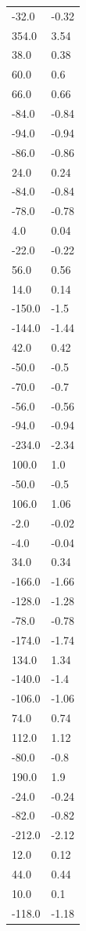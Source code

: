 \begin{longtable}{ll}
-32.0 & -0.32 \\
354.0 & 3.54 \\
38.0 & 0.38 \\
60.0 & 0.6 \\
66.0 & 0.66 \\
-84.0 & -0.84 \\
-94.0 & -0.94 \\
-86.0 & -0.86 \\
24.0 & 0.24 \\
-84.0 & -0.84 \\
-78.0 & -0.78 \\
4.0 & 0.04 \\
-22.0 & -0.22 \\
56.0 & 0.56 \\
14.0 & 0.14 \\
-150.0 & -1.5 \\
-144.0 & -1.44 \\
42.0 & 0.42 \\
-50.0 & -0.5 \\
-70.0 & -0.7 \\
-56.0 & -0.56 \\
-94.0 & -0.94 \\
-234.0 & -2.34 \\
100.0 & 1.0 \\
-50.0 & -0.5 \\
106.0 & 1.06 \\
-2.0 & -0.02 \\
-4.0 & -0.04 \\
34.0 & 0.34 \\
-166.0 & -1.66 \\
-128.0 & -1.28 \\
-78.0 & -0.78 \\
-174.0 & -1.74 \\
134.0 & 1.34 \\
-140.0 & -1.4 \\
-106.0 & -1.06 \\
74.0 & 0.74 \\
112.0 & 1.12 \\
-80.0 & -0.8 \\
190.0 & 1.9 \\
-24.0 & -0.24 \\
-82.0 & -0.82 \\
-212.0 & -2.12 \\
12.0 & 0.12 \\
44.0 & 0.44 \\
10.0 & 0.1 \\
-118.0 & -1.18 \\

\end{longtable}
